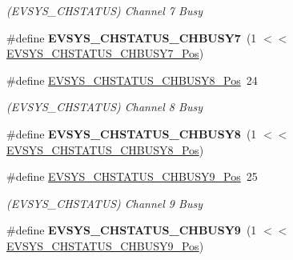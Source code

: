 \begin{DoxyCompactItemize}
\begin{DoxyCompactList}\small\item\em (E\+V\+S\+Y\+S\+\_\+\+C\+H\+S\+T\+A\+T\+U\+S) Channel 7 Busy \end{DoxyCompactList}\item 
\hypertarget{group___s_a_m_l21___e_v_s_y_s_gaec9c768e83d872b7df72557d7491f015}{}\#define {\bfseries E\+V\+S\+Y\+S\+\_\+\+C\+H\+S\+T\+A\+T\+U\+S\+\_\+\+C\+H\+B\+U\+S\+Y7}~(1 $<$$<$ \hyperlink{group___s_a_m_l21___e_v_s_y_s_gadd160959cc215f9816343ce458e9c828}{E\+V\+S\+Y\+S\+\_\+\+C\+H\+S\+T\+A\+T\+U\+S\+\_\+\+C\+H\+B\+U\+S\+Y7\+\_\+\+Pos})\label{group___s_a_m_l21___e_v_s_y_s_gaec9c768e83d872b7df72557d7491f015}

\item 
\hypertarget{group___s_a_m_l21___e_v_s_y_s_ga99be24dbc78184e3f1bee203b80f34a8}{}\#define \hyperlink{group___s_a_m_l21___e_v_s_y_s_ga99be24dbc78184e3f1bee203b80f34a8}{E\+V\+S\+Y\+S\+\_\+\+C\+H\+S\+T\+A\+T\+U\+S\+\_\+\+C\+H\+B\+U\+S\+Y8\+\_\+\+Pos}~24\label{group___s_a_m_l21___e_v_s_y_s_ga99be24dbc78184e3f1bee203b80f34a8}

\begin{DoxyCompactList}\small\item\em (E\+V\+S\+Y\+S\+\_\+\+C\+H\+S\+T\+A\+T\+U\+S) Channel 8 Busy \end{DoxyCompactList}\item 
\hypertarget{group___s_a_m_l21___e_v_s_y_s_ga99a0326dcf4285502adceee1885f6a6c}{}\#define {\bfseries E\+V\+S\+Y\+S\+\_\+\+C\+H\+S\+T\+A\+T\+U\+S\+\_\+\+C\+H\+B\+U\+S\+Y8}~(1 $<$$<$ \hyperlink{group___s_a_m_l21___e_v_s_y_s_ga99be24dbc78184e3f1bee203b80f34a8}{E\+V\+S\+Y\+S\+\_\+\+C\+H\+S\+T\+A\+T\+U\+S\+\_\+\+C\+H\+B\+U\+S\+Y8\+\_\+\+Pos})\label{group___s_a_m_l21___e_v_s_y_s_ga99a0326dcf4285502adceee1885f6a6c}

\item 
\hypertarget{group___s_a_m_l21___e_v_s_y_s_gaab28b2cfe9e5f4adcdd0537d485835e2}{}\#define \hyperlink{group___s_a_m_l21___e_v_s_y_s_gaab28b2cfe9e5f4adcdd0537d485835e2}{E\+V\+S\+Y\+S\+\_\+\+C\+H\+S\+T\+A\+T\+U\+S\+\_\+\+C\+H\+B\+U\+S\+Y9\+\_\+\+Pos}~25\label{group___s_a_m_l21___e_v_s_y_s_gaab28b2cfe9e5f4adcdd0537d485835e2}

\begin{DoxyCompactList}\small\item\em (E\+V\+S\+Y\+S\+\_\+\+C\+H\+S\+T\+A\+T\+U\+S) Channel 9 Busy \end{DoxyCompactList}\item 
\hypertarget{group___s_a_m_l21___e_v_s_y_s_ga8ad1d75c07d64dc3f21cefb3f808aec1}{}\#define {\bfseries E\+V\+S\+Y\+S\+\_\+\+C\+H\+S\+T\+A\+T\+U\+S\+\_\+\+C\+H\+B\+U\+S\+Y9}~(1 $<$$<$ \hyperlink{group___s_a_m_l21___e_v_s_y_s_gaab28b2cfe9e5f4adcdd0537d485835e2}{E\+V\+S\+Y\+S\+\_\+\+C\+H\+S\+T\+A\+T\+U\+S\+\_\+\+C\+H\+B\+U\+S\+Y9\+\_\+\+Pos})\label{group___s_a_m_l21___e_v_s_y_s_ga8ad1d75c07d64dc3f21cefb3f808aec1}


\end{DoxyCompactItemize}
